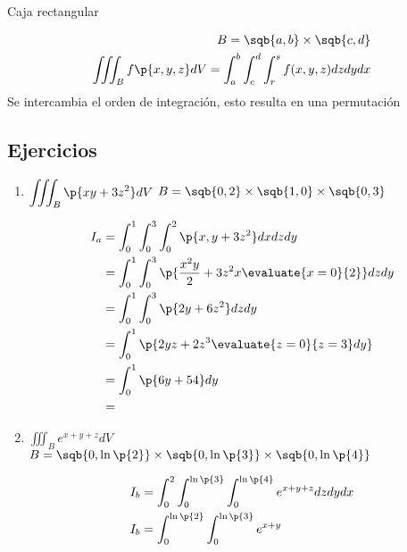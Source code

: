 \section{}
Caja rectangular    
\begin{figure}[H]
    \centering
\end{figure}
\begin{center}
   \begin{align*}
       B = \sqb{a,b} \times \sqb{c,d} \\ 
       \iiint_{B}^{}f\p{x,y,z} dV = \int_{a}^{b}\int_{c}^{d}\int_{r}^{s} f(x,y,z) dz dy dx \\  
   \end{align*}
   Se intercambia el orden de integración, esto resulta en una permutación
\end{center}

\subsection{Ejercicios}
\begin{enumerate}
    \item $\displaystyle \iiint_{B}^{}\p{xy+3z^2} dV$ $\displaystyle B = \sqb{0,2} \times \sqb{1,0} \times \sqb{0,3} $ 
        \begin{center}
           \begin{align*}
               I_a &= \int_{0}^{1}\int_{0}^{3}\int_{0}^{2}\p{x,y+3z^2} dx dz dy \\ 
               &= \int_{0}^{1}\int_{0}^{3}\p{\frac{x^2y}{2} +3z^2x\evaluate{x=0}{2} } dz dy \\ 
                &= \int_{0}^{1}\int_{0}^{3}\p{2y+6z^2} dz dy \\ 
                &= \int_{0}^{1}\p{2yz+2z^3\evaluate{z=0}{z=3}   dy} \\ 
                &= \int_{0}^{1}\p{6y+54} dy \\ 
                &= \\ 
           \end{align*}
        \end{center}
    
    \item $\displaystyle \iiint_{B}^{}e^{x+y+z}dV$ $\displaystyle B = \sqb{0,\ln\p{ 2 }  } \times \sqb{0,\ln\p{ 3 }  } \times \sqb{0,\ln\p{ 4 }  } $  
        \begin{center}
           \begin{align*}
                I_b &= \int_{0}^{2}\int_{0}^{\ln\p{ 3 }  }\int_{0}^{\ln\p{ 4 }  } e^{x+y+z} dz dy dx \\ 
                I_b &= \int_{0}^{\ln\p{ 2 }  }\int_{0}^{\ln\p{ 3 }  }e^{x+y} \\ 
           \end{align*}
        \end{center}
\end{enumerate}


